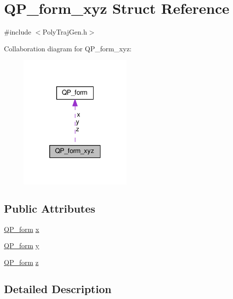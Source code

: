 \hypertarget{struct_q_p__form__xyz}{}\section{Q\+P\+\_\+form\+\_\+xyz Struct Reference}
\label{struct_q_p__form__xyz}


{\ttfamily \#include $<$Poly\+Traj\+Gen.\+h$>$}



Collaboration diagram for Q\+P\+\_\+form\+\_\+xyz\+:
\nopagebreak
\begin{figure}[H]
\begin{center}
\leavevmode
\includegraphics[width=157pt]{struct_q_p__form__xyz__coll__graph}
\end{center}
\end{figure}
\subsection*{Public Attributes}
\begin{DoxyCompactItemize}
\item 
\hyperlink{struct_q_p__form}{Q\+P\+\_\+form} \hyperlink{struct_q_p__form__xyz_a3a6e7a104ef31fda66007013ba3741f8}{x}
\item 
\hyperlink{struct_q_p__form}{Q\+P\+\_\+form} \hyperlink{struct_q_p__form__xyz_a3e1c8fbfd5a4650fb45fc0ca14c2bcb6}{y}
\item 
\hyperlink{struct_q_p__form}{Q\+P\+\_\+form} \hyperlink{struct_q_p__form__xyz_a243478dd3ac49ecf0d6fceffbcdf408b}{z}
\end{DoxyCompactItemize}


\subsection{Detailed Description}


